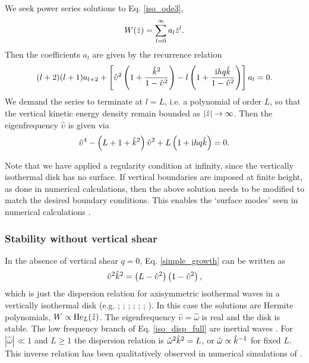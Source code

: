 
We seek power series solutions to Eq. \ref{iso_ode3}, 
\begin{align}
  W(\hat{z}) = \sum_{l=0}^\infty a_l\hat{z}^l. 
\end{align}
Then the coefficients $a_l$ are given by the recurrence relation
\begin{align}
  (l+2)(l+1)a_{l+2} +
  \left[\hat{\upsilon}^2\left(1+\frac{\hat{k}^2}{1-\hat{\upsilon}^2}\right)
    - l\left(1+\frac{\mathrm{i} h q
        \hat{k}}{1-\hat{\upsilon}^2}\right)\right] a_l = 0. 
\end{align}
We demand the series to terminate  at $l=L$, i.e. a polynomial of
order $L$, so that the vertical kinetic energy density remain bounded as 
$|\hat{z}|\to\infty$.  Then the eigenfrequency $\hat{\upsilon}$ is given via 
\begin{align}
\hat{\upsilon}^4 - \left(L+1+\hat{k}^2\right)\hat{\upsilon}^2 + L\left(1 +
  \mathrm{i} h q \hat{k}\right) = 0. \label{simple_growth}
\end{align}

Note that we have applied a regularity condition at infinity, since
the vertically isothermal disk has no surface. If vertical boundaries
are imposed at finite height, as done in numerical calculations, then
the above solution needs to be modified to match the desired boundary
conditions. This enables the `surface modes' seen in numerical
calculations . 

\subsubsection{Stability without vertical shear}\label{stable_novshear}
In the absence of vertical shear $q=0$, Eq. \ref{simple_growth} can be
written as \begin{align}
  \hat{\upsilon}^2\hat{k}^2 =
  \left(L-\hat{\upsilon}^2\right)\left(1-\hat{\upsilon}^2\right), \label{iso_disp_full}
\end{align}
which is just the dispersion relation for axisymmetric isothermal waves in a
vertically isothermal disk (e.g. \citealt{okazaki87}; \citealt{takeuchi98}; \citealt{tanaka02}; 
\citealt{zhang06}; \citealt{ogilvie13}; \citealt{barker14}; ). In 
this case the solutions are Hermite polynomials, $W\propto
\operatorname{He}_L(\hat{z})$.  The eigenfrequency $\hat{\upsilon} = \hat{\omega}$ is real and the disk
is stable. The low frequency branch of Eq. \ref{iso_disp_full} are 
inertial waves \citep{balbus03}. For 
$|\hat{\omega}|\ll 1$ and $L\geq 1$ the dispersion relation is
$\hat{\omega}^2\hat{k}^2 = L$, or $\hat{\omega}\propto \hat{k}^{-1}$ for
fixed $L$.  This inverse relation has been qualitatively
observed in numerical simulations of \cite{stoll14}. 

